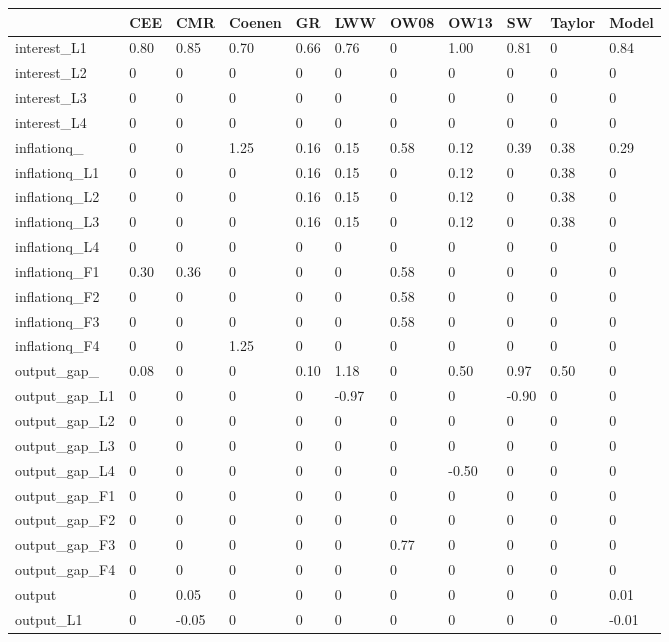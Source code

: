 \begin{tabular}{lllllllllll}
& CEE & CMR & Coenen & GR & LWW & OW08 & OW13 & SW & Taylor & Model \\ 
\hline 
interest\_L1 & 0.80 & 0.85 & 0.70 & 0.66 & 0.76 & 0 & 1.00 & 0.81 & 0 & 0.84 \\ 
interest\_L2 & 0 & 0 & 0 & 0 & 0 & 0 & 0 & 0 & 0 & 0 \\ 
interest\_L3 & 0 & 0 & 0 & 0 & 0 & 0 & 0 & 0 & 0 & 0 \\ 
interest\_L4 & 0 & 0 & 0 & 0 & 0 & 0 & 0 & 0 & 0 & 0 \\ 
inflationq\_ & 0 & 0 & 1.25 & 0.16 & 0.15 & 0.58 & 0.12 & 0.39 & 0.38 & 0.29 \\ 
inflationq\_L1 & 0 & 0 & 0 & 0.16 & 0.15 & 0 & 0.12 & 0 & 0.38 & 0 \\ 
inflationq\_L2 & 0 & 0 & 0 & 0.16 & 0.15 & 0 & 0.12 & 0 & 0.38 & 0 \\ 
inflationq\_L3 & 0 & 0 & 0 & 0.16 & 0.15 & 0 & 0.12 & 0 & 0.38 & 0 \\ 
inflationq\_L4 & 0 & 0 & 0 & 0 & 0 & 0 & 0 & 0 & 0 & 0 \\ 
inflationq\_F1 & 0.30 & 0.36 & 0 & 0 & 0 & 0.58 & 0 & 0 & 0 & 0 \\ 
inflationq\_F2 & 0 & 0 & 0 & 0 & 0 & 0.58 & 0 & 0 & 0 & 0 \\ 
inflationq\_F3 & 0 & 0 & 0 & 0 & 0 & 0.58 & 0 & 0 & 0 & 0 \\ 
inflationq\_F4 & 0 & 0 & 1.25 & 0 & 0 & 0 & 0 & 0 & 0 & 0 \\ 
output\_gap\_ & 0.08 & 0 & 0 & 0.10 & 1.18 & 0 & 0.50 & 0.97 & 0.50 & 0 \\ 
output\_gap\_L1 & 0 & 0 & 0 & 0 & -0.97 & 0 & 0 & -0.90 & 0 & 0 \\ 
output\_gap\_L2 & 0 & 0 & 0 & 0 & 0 & 0 & 0 & 0 & 0 & 0 \\ 
output\_gap\_L3 & 0 & 0 & 0 & 0 & 0 & 0 & 0 & 0 & 0 & 0 \\ 
output\_gap\_L4 & 0 & 0 & 0 & 0 & 0 & 0 & -0.50 & 0 & 0 & 0 \\ 
output\_gap\_F1 & 0 & 0 & 0 & 0 & 0 & 0 & 0 & 0 & 0 & 0 \\ 
output\_gap\_F2 & 0 & 0 & 0 & 0 & 0 & 0 & 0 & 0 & 0 & 0 \\ 
output\_gap\_F3 & 0 & 0 & 0 & 0 & 0 & 0.77 & 0 & 0 & 0 & 0 \\ 
output\_gap\_F4 & 0 & 0 & 0 & 0 & 0 & 0 & 0 & 0 & 0 & 0 \\ 
output & 0 & 0.05 & 0 & 0 & 0 & 0 & 0 & 0 & 0 & 0.01 \\ 
output\_L1 & 0 & -0.05 & 0 & 0 & 0 & 0 & 0 & 0 & 0 & -0.01 \\ 

\end{tabular}
